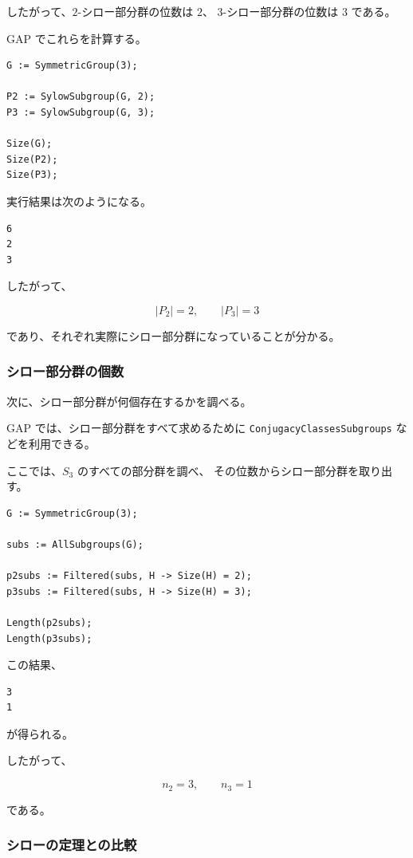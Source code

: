 したがって、$2$-シロー部分群の位数は $2$、
$3$-シロー部分群の位数は $3$ である。

GAP でこれらを計算する。

\begin{lstlisting}[language={}]
G := SymmetricGroup(3);

P2 := SylowSubgroup(G, 2);
P3 := SylowSubgroup(G, 3);

Size(G);
Size(P2);
Size(P3);
\end{lstlisting}

実行結果は次のようになる。

\begin{lstlisting}
6
2
3
\end{lstlisting}

したがって、

\[
|P_2|=2,\qquad |P_3|=3
\]

であり、それぞれ実際にシロー部分群になっていることが分かる。

\subsubsection{シロー部分群の個数}

次に、シロー部分群が何個存在するかを調べる。

GAP では、シロー部分群をすべて求めるために
\verb|ConjugacyClassesSubgroups| などを利用できる。

ここでは、$S_3$ のすべての部分群を調べ、
その位数からシロー部分群を取り出す。

\begin{lstlisting}[language={}]
G := SymmetricGroup(3);

subs := AllSubgroups(G);

p2subs := Filtered(subs, H -> Size(H) = 2);
p3subs := Filtered(subs, H -> Size(H) = 3);

Length(p2subs);
Length(p3subs);
\end{lstlisting}

この結果、

\begin{lstlisting}
3
1
\end{lstlisting}

が得られる。

したがって、

\[
n_2=3,\qquad n_3=1
\]

である。

\subsubsection{シローの定理との比較}


